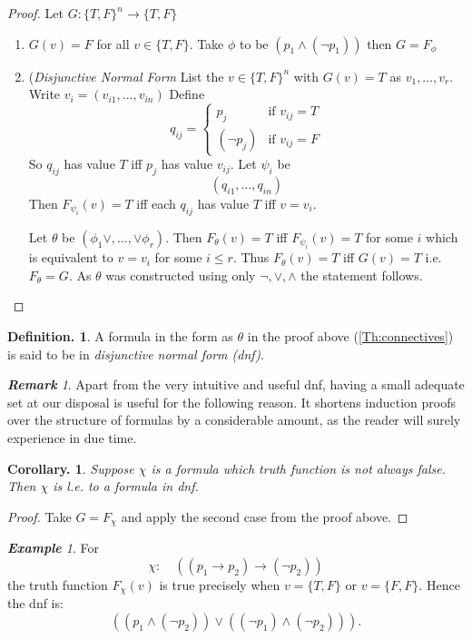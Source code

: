\documentclass[a4paper,oneside,11pt,DIV=12,parskip=half]{scrartcl}
\theoremstyle{plain}
\newtheorem{corollary}[theorem]{Corollary.}
\theoremstyle{definition}
\newtheorem{definition}[theorem]{Definition.}
\newtheorem{remark, definition}[theorem]{Remark and Definition.}
\newtheorem{lemma, definition}[theorem]{Lemma and Definition.}
\newtheorem{theorem, definition}[theorem]{Theorem and Definition.}
\theoremstyle{remark}
\newtheorem*{remark}{\textbf{Remark}}
\newtheorem*{example}{\textbf{Example}}
\newtheorem*{remark, example}{\textbf{Remark and Exercise}}
\begin{document}
\begin{proof}
Let $G: \{T,F\}^n \rightarrow \{T,F\}$
\begin{enumerate}
\item $G(v) = F$ for all $v \in \{T,F\}$.
Take $\phi$ to be $(p_1 \land(\lnot p_1))$ then $ G = F_{\phi}$
\item (\emph{Disjunctive Normal Form}
List the $v \in \{ T,F \}^n$ with $G(v) = T$ as $v_1, \dots, v_r$.
Write $v_i = (v_{i1},\dots,v_{in})$
Define
\[ q_{ij} = \begin{cases} p_j &\text{if } v_{ij} = T \\  ( \lnot p_j) &\text{if } v_{ij} = F
\end{cases}\]
So $q_{ij}$ has value $T$ iff $p_j$ has value $v_{ij}$.
Let $\psi_i$ be
	\[ (q_{i1}, \dots, q_{in})\]
Then $F_{\psi_i}(v) = T$ iff each $q_{ij}$ has value $T$ iff $v = v_i$.

Let $\theta$ be $(\phi_1 \lor, \dots , \lor \phi_r)$.
Then $F_{\theta}(v) = T$ iff $F_{\psi_i}(v) = T$ for some $i$ which is equivalent to $v = v_i$ for some $i \leq r$.
Thus $F_{\theta} (v) = T$ iff $G(v) = T$ i.e. $F_{\theta} = G$.
As $\theta$ was constructed using only $\lnot,\lor,\land$ the statement follows.
\end{enumerate}

\end{proof}

\begin{definition}
A formula in the form as $\theta$ in the proof above (\ref{Th:connectives}) is said to be in \emph{disjunctive normal form (dnf)}.
\end{definition}

\begin{remark}

Apart from the very intuitive and useful dnf, having a small adequate set at our disposal is useful for the following reason. It shortens induction proofs over the structure of formulas by a considerable amount, as the reader will surely experience in due time.

\end{remark}

\begin{corollary} Suppose $\chi$ is a formula which truth function is not always false. Then $\chi$ is l.e. to a formula in dnf.
\end{corollary}

\begin{proof}
Take $G = F_{\chi}$ and apply the second case from the proof above.
\end{proof}
\begin{example} For
\[ \chi: \quad (( p_1 \rightarrow p_2) \rightarrow (\lnot p_2)) \] 
the truth function $F_{\chi}(v)$ is true precisely when $v = \{T,F\}$ or $ v = \{F, F \}$.
Hence the dnf is:
\[ ((p_1 \land (\lnot p_2)) \lor ((\lnot p_1) \land ( \lnot p_2))). \]

\end{example}
\end{document}
